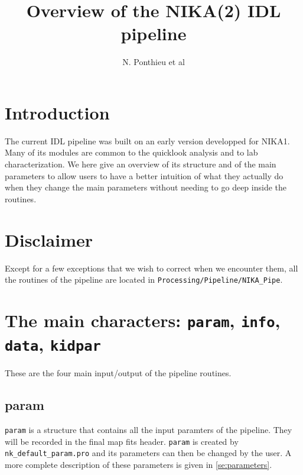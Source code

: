 \documentclass[a4paper,10pt]{article}
\title{Overview of the NIKA(2) IDL pipeline}
\author{N. Ponthieu et al}
\begin{document}
\maketitle




\section{Introduction}

The current IDL pipeline was built on an early version developped for
NIKA1. Many of its modules are common to the quicklook analysis and to lab
characterization. We here give an overview of its structure and of the main
parameters to allow users to have a better intuition of what they actually do
when they change the main parameters without needing to go deep inside the
routines.

\section{Disclaimer}

Except for a few exceptions that we wish to correct when we encounter them, all
the routines of the pipeline are located in {\tt Processing/Pipeline/NIKA\_Pipe}.

\section{The main characters: {\tt param}, {\tt info}, {\tt data}, {\tt kidpar}}

These are the four main input/output of the pipeline routines.

\subsection{param}
{\tt param} is a structure that contains all the input paramters of the
pipeline. They will be recorded in the final map fits header. {\tt param}
is created by {\tt nk\_default\_param.pro} and its parameters can then be changed
by the user. A more complete description of these parameters is given in \ref{se:parameters}.
\end{document}
